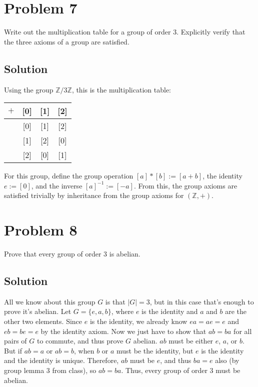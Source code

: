 \documentclass[fleqn]{article}
\begin{document}
    \section{Problem 7}
    Write out the multiplication table for a group of order 3.  Explicitly verify that the three axioms of a group are satisfied.
        
        \subsection{Solution}
        Using the group $\mathbb{Z}/3\mathbb{Z}$, this is the multiplication table: \\
        
        \begin{tabular}{ c|c|c|c| } 
            $+$ & {[0]} & {[1]} & {[2]} \\ \hline 
            [0] & [0] & [1] & [2] \\ \hline 
            [1] & [1] & [2] & [0] \\ \hline 
            [2] & [2] & [0] & [1] \\ \hline
        \end{tabular}
        $ $ \\
        $ $ \\
        \noindent
        For this group, define the group operation $[a] * [b] := [a + b]$, the identity $e := [0]$, and the inverse $[a]^{-1} := [-a]$.  From this, the group axioms are satisfied trivially by inheritance from the group axioms for $(\mathbb{Z}, +)$.
    
    \pagebreak
    
    \section{Problem 8}
    Prove that every group of order 3 is abelian.
        
        \subsection{Solution}
        All we know about this group $G$ is that $|G| = 3$, but in this case that's enough to prove it's abelian.  Let $G = \{e, a, b\}$, where $e$ is the identity and $a$ and $b$ are the other two elements.  Since $e$ is the identity, we already know $ea = ae = e$ and $eb = be = e$ by the identity axiom.  Now we just have to show that $ab = ba$ for all pairs of $G$ to commute, and thus prove $G$ abelian.  $ab$ must be either $e$, $a$, or $b$.  But if $ab = a$ or $ab = b$, when $b$ or $a$ must be the identity, but $e$ is the identity and the identity is unique.  Therefore, $ab$ must be $e$, and thus $ba = e$ also (by group lemma 3 from class), so $ab = ba$.  Thus, every group of order 3 must be abelian.
        
\end{document}
